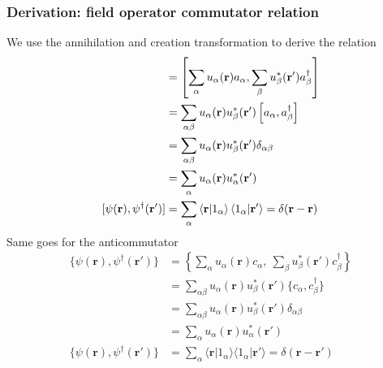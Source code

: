 \documentclass[../../../main.tex]{subfiles}
\begin{document}
\subsubsection{Derivation: field operator commutator relation}
We use the annihilation and creation transformation to derive the relation
\begin{align*}
  [\psi(\mathbf{r}), \psi^{\dagger}(\mathbf{r}')] 
  & =  \left[ \sum_{\alpha} u_{\alpha}(\mathbf{r})a_{\alpha}, \sum_{\beta} u_{\beta}^{*}(\mathbf{r}')a_{\beta}^{\dagger} \right] \\
  & = \sum_{\alpha \beta} u_{\alpha}(\mathbf{r})u_{\beta}^{*}(\mathbf{r}')\left[a_{\alpha}, a_{\beta}^{\dagger}\right]\\
  & = \sum_{\alpha \beta} u_{\alpha}(\mathbf{r})u_{\beta}^{*}(\mathbf{r}')\delta_{\alpha \beta} \\
  & = \sum_{\alpha } u_{\alpha}(\mathbf{r})u_{\alpha}^{*}(\mathbf{r}') \\
  [\psi(\mathbf{r}), \psi^{\dagger}(\mathbf{r}')] 
  & = \sum_{\alpha } \braket{\mathbf{r }  | 1_\alpha }\braket{1_\alpha  | \mathbf{r}'} = \delta (\mathbf{r }-\mathbf{r})
\end{align*}
Same goes for the anticommutator
\begin{align*}
\{\psi(\mathbf{r}),\psi^\dagger(\mathbf{r}')\} 
&= \left\{\sum_\alpha u_\alpha(\mathbf{r})c_\alpha,\ \sum_\beta u^*_\beta(\mathbf{r}')c^\dagger_\beta\right\}\\
&= \sum_{\alpha\beta} u_\alpha(\mathbf{r})u^*_\beta(\mathbf{r}')\{c_\alpha,c^\dagger_\beta\}\\
&= \sum_{\alpha\beta} u_\alpha(\mathbf{r})u^*_\beta(\mathbf{r}')\delta_{\alpha\beta}\\
&= \sum_\alpha u_\alpha(\mathbf{r})u^*_\alpha(\mathbf{r}')\\
\{\psi(\mathbf{r}),\psi^\dagger(\mathbf{r}')\} 
&= \sum_\alpha \langle \mathbf{r}|1_\alpha\rangle\langle1_\alpha|\mathbf{r}'\rangle = \delta(\mathbf{r}-\mathbf{r}')
\end{align*}
\end{document}
